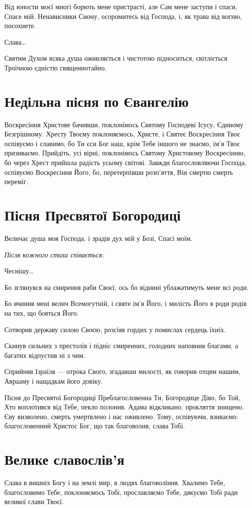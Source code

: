 \documentclass[chapters.tex]{subfiles}
\begin{document}
Від юности моєї многі борють мене пристрасті, але Сам мене заступи і спаси, Спасе мій. Ненависники Сиону, осоромитесь від Господа, і, як трава від вогню, посохнете.

Слава…

Святим Духом всяка душа оживляється і чистотою підноситься, світліється Троїчною єдністю священнотайно.

\section{Недільна пісня по Євангелію}
Воскресіння Христове бачивши, поклонімось Святому Господеві Ісусу, Єдиному Безгрішному. Хресту Твоєму поклоняємось, Христе, і Святеє Воскресіння Твоє оспівуємо і славимо, бо Ти єси Бог наш, крім Тебе іншого не знаємо, ім’я Твоє призиваємо. Прийдіть, усі вірні, поклонімось Святому Христовому Воскресінню, бо через Хрест прийшла радість усьому світові. Завжди благословляючи Господа, оспівуємо Воскресіння Його, бо, перетерпівши розп’яття, Він смертю смерть переміг.

\section{Пісня Пресвятої Богородиці}
Величає душа моя Господа, і зрадів дух мій у Бозі, Спасі моїм.

\emph{Після кожного стиха співається:}

Чеснішу…

Бо зглянувся на смирення раби Своєї, ось бо віднині ублажатимуть мене всі роди.

Бо вчинив мені велич Всемогутній, і святе ім’я Його, і милість Його в роди родів на тих, що бояться Його.

Сотворив державу силою Своєю, розсіяв гордих у помислах сердець їхніх.

Скинув сильних з престолів і підніс смиренних, голодних наповнив благами, а багатих відпустив ні з чим.

Сприйняв Ізраїля — отрока Свого, згадавши милості, як говорив отцям нашим, Аврааму і нащадкам його довіку.

Пісня до Пресвятої Богородиці
Преблагословенна Ти, Богородице Діво, бо Той, Хто воплотився від Тебе, пекло полонив. Адама відкликано, прокляття знищено. Єву визволено, смерть умертвлено і нас оживлено. Тому, оспівуючи, взиваємо: благословенний Христос Бог, що так благоволив, слава Тобі.

\section{Велике славослів’я}
Слава в вишніх Богу і на землі мир, в людях благовоління. Хвалимо Тебе, благословимо Тебе, поклоняємось Тобі, прославляємо Тебе, дякуємо Тобі ради великої слави Твоєї.
\end{document}
